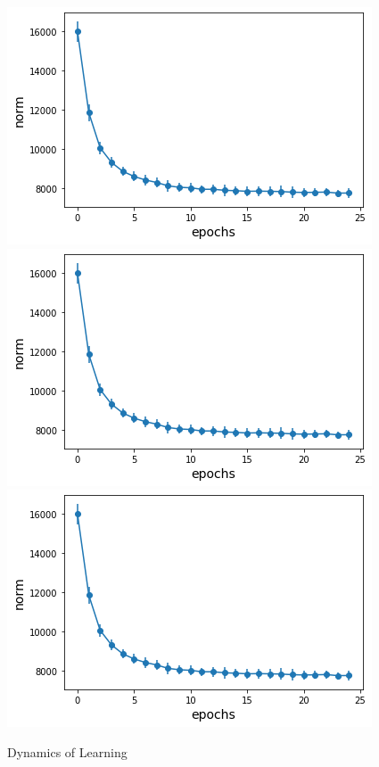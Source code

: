 \begin{figure}[h]
\centering
\includegraphics[scale=0.25]{figs/path-gram.png}
\includegraphics[scale=0.25]{figs/path-gram.png}
\includegraphics[scale=0.25]{figs/path-gram.png}
\caption{Dynamics of Learning}
\label{fig:dynamics}
\end{figure}
